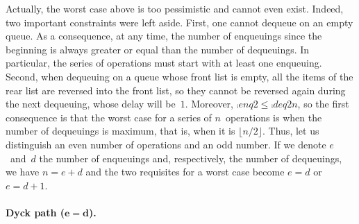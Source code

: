 Actually, the worst case above is too pessimistic and cannot even
exist. Indeed, two important constraints were left aside. First, one
cannot dequeue on an empty queue. As a consequence, at any time, the
number of enqueuings since the beginning is always greater or equal
than the number of dequeuings. In particular, the series of operations
must start with at least one enqueuing. Second, when dequeuing on a
queue whose front list is empty, all the items of the rear list are
reversed into the front list, so they cannot be reversed again during
the next dequeuing, whose delay will be~\(1\). Moreover,
\(\comp{enq2}{} \leqslant \comp{deq2}{n}\), so the first consequence
is that the worst case for a series of \(n\)~operations is when the
number of dequeuings is maximum, that is, when it is
\(\lfloor{n/2}\rfloor\). Thus, let us distinguish an even number of
operations and an odd number. If we denote \(e\)~and~\(d\) the number
of enqueuings and, respectively, the number of dequeuings, we have \(n
= e + d\) and the two requisites for a worst case become \(e=d\) or
\(e=d+1\).

\medskip

\paragraph{Dyck path (\(\boldsymbol{e=d}\)).}

